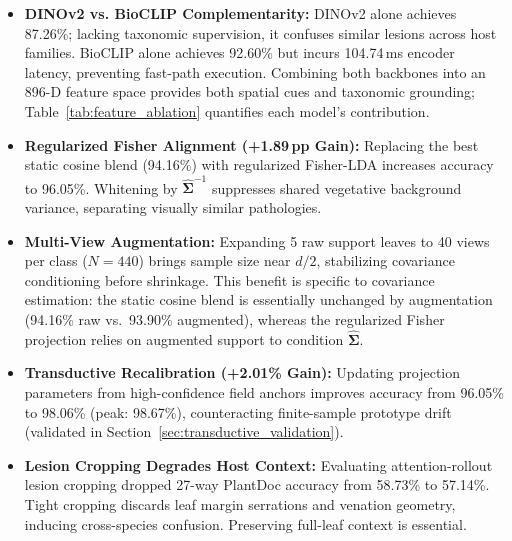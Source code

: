 \documentclass[preprint,12pt]{elsarticle}
\begin{document}
\begin{itemize}
    \item \textbf{DINOv2 vs. BioCLIP Complementarity:} DINOv2 alone achieves 87.26\%; lacking taxonomic supervision, it confuses similar lesions across host families. BioCLIP alone achieves 92.60\% but incurs 104.74\,ms encoder latency, preventing fast-path execution. Combining both backbones into an 896-D feature space provides both spatial cues and taxonomic grounding; Table~\ref{tab:feature_ablation} quantifies each model's contribution.
    \item \textbf{Regularized Fisher Alignment (+1.89\,pp Gain):} Replacing the best static cosine blend (94.16\%) with regularized Fisher-LDA increases accuracy to 96.05\%. Whitening by $\hat{\mathbf{\Sigma}}^{-1}$ suppresses shared vegetative background variance, separating visually similar pathologies.
    \item \textbf{Multi-View Augmentation:} Expanding 5 raw support leaves to 40 views per class ($N=440$) brings sample size near $d/2$, stabilizing covariance conditioning before shrinkage. This benefit is specific to covariance estimation: the static cosine blend is essentially unchanged by augmentation (94.16\% raw vs.\ 93.90\% augmented), whereas the regularized Fisher projection relies on augmented support to condition $\hat{\mathbf{\Sigma}}$.
    \item \textbf{Transductive Recalibration (+2.01\% Gain):} Updating projection parameters from high-confidence field anchors improves accuracy from 96.05\% to 98.06\% (peak: 98.67\%), counteracting finite-sample prototype drift (validated in Section~\ref{sec:transductive_validation}).
    \item \textbf{Lesion Cropping Degrades Host Context:} Evaluating attention-rollout lesion cropping dropped 27-way PlantDoc accuracy from 58.73\% to 57.14\%. Tight cropping discards leaf margin serrations and venation geometry, inducing cross-species confusion. Preserving full-leaf context is essential.
\end{itemize}
\end{document}
